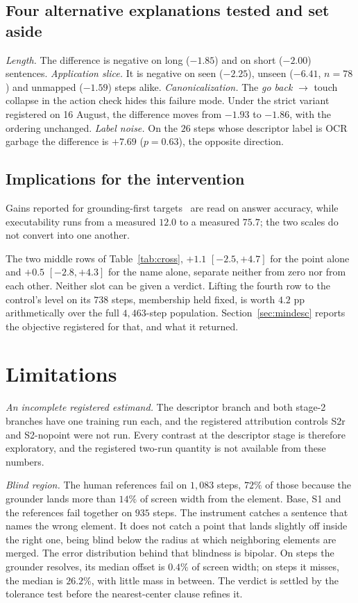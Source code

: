 \documentclass[conference]{IEEEtran}
\begin{document}
\subsection{Four alternative explanations tested and set aside}
\label{sec:alt}
\emph{Length.} The difference is negative on long ($-1.85$) and on short ($-2.00$) sentences.
\emph{Application slice.} It is negative on seen ($-2.25$), unseen ($-6.41$, $n = 78$) and
unmapped ($-1.59$) steps alike. \emph{Canonicalization.} The \emph{go back} $\to$ touch collapse
in the action check hides this failure mode. Under the strict variant registered on 16 August,
the difference moves from $-1.93$ to $-1.86$, with the ordering unchanged. \emph{Label noise.}
On the $26$ steps whose descriptor label is OCR garbage the difference is $+7.69$ ($p = 0.63$), the opposite
direction.

\subsection{Implications for the intervention}
Gains reported for grounding-first targets~\cite{gcot} are read on answer accuracy, while
executability runs from a measured $12.0$ to a measured $75.7$; the two scales do not convert
into one another.

The two middle rows of Table~\ref{tab:cross}, $+1.1$ $[-2.5, +4.7]$ for the point alone and
$+0.5$ $[-2.8, +4.3]$ for the name alone, separate neither from zero nor from each other.
Neither slot can be given a verdict. Lifting the fourth row to the control's level on its $738$ steps, membership held fixed, is worth $4.2$ pp arithmetically over the full
$4{,}463$-step population. Section~\ref{sec:mindesc} reports the objective registered for that,
and what it returned.

\section{Limitations}
\label{sec:limits}

\emph{An incomplete registered estimand.} The descriptor branch and both stage-2 branches have
one training run each, and the registered attribution controls S2r and S2-nopoint were not run.
Every contrast at the descriptor stage is therefore exploratory, and the registered two-run
quantity is not available from these numbers.

\emph{Blind region.} The human references fail on $1{,}083$ steps, $72\%$ of those because the
grounder lands more than $14\%$ of screen width from the element. Base, S1 and the references
fail together on $935$ steps. The instrument catches a sentence that names the wrong element. It
does not catch a point that lands slightly off inside the right one, being blind below the
radius at which neighboring elements are merged. The error distribution behind that
blindness is bipolar. On steps the grounder resolves, its median offset is $0.4\%$ of screen
width; on steps it misses, the median is $26.2\%$, with little mass in between. The verdict is
settled by the tolerance test before the nearest-center clause refines it.
\end{document}

